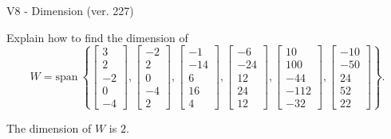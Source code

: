 \begin{exercise}
  \begin{exerciseTitle}V8 - Dimension (ver. 227)\end{exerciseTitle}
  \begin{exerciseStatement}
    Explain how to find the dimension of 
\[W=\mathrm{span}\ \left\{\left[\begin{array}{r}
3 \\
2 \\
-2 \\
0 \\
-4
\end{array}\right] , \left[\begin{array}{r}
-2 \\
2 \\
0 \\
-4 \\
2
\end{array}\right] , \left[\begin{array}{r}
-1 \\
-14 \\
6 \\
16 \\
4
\end{array}\right] , \left[\begin{array}{r}
-6 \\
-24 \\
12 \\
24 \\
12
\end{array}\right] , \left[\begin{array}{r}
10 \\
100 \\
-44 \\
-112 \\
-32
\end{array}\right] , \left[\begin{array}{r}
-10 \\
-50 \\
24 \\
52 \\
22
\end{array}\right]\right\}.\]



  \end{exerciseStatement}
  \begin{exerciseAnswer}
   The dimension of \(W\) is  \(2\).
  


  \end{exerciseAnswer}
\end{exercise}